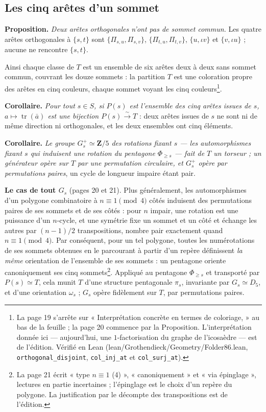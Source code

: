 \documentclass[11pt,a4paper]{article}
\begin{document}
\subsection*{Les cinq arêtes d'un sommet}

\textbf{Proposition.} \emph{Deux arêtes orthogonales n'ont pas de sommet
commun.} Les quatre arêtes orthogonales à $\{s, t\}$ sont $\{\Pi_{s,u},
\Pi_{s,v}\}$, $\{\Pi_{t,u}, \Pi_{t,v}\}$, $\{u, \iota v\}$ et $\{v, \iota u\}$ ;
aucune ne rencontre $\{s, t\}$.

Ainsi chaque classe de $T$ est un ensemble de six arêtes deux à deux sans
sommet commun, couvrant les douze sommets : la partition $T$ est une
coloration propre des arêtes en cinq couleurs, chaque sommet voyant les cinq
couleurs\footnote{La page 19 s'arrête sur « Interprétation concrète en termes
de coloriage, » au bas de la feuille ; la page 20 commence par la Proposition.
L'interprétation donnée ici --- aujourd'hui, une $1$-factorisation du graphe
de l'icosaèdre --- est de l'édition. Vérifié en Lean
(lean/Grothendieck/Geometry/Folder86.lean, \texttt{orthogonal\_disjoint},
\texttt{col\_inj\_at} et \texttt{col\_surj\_at}).}.

\textbf{Corollaire.} \emph{Pour tout $s \in S$, si $P(s)$ est l'ensemble des
cinq arêtes issues de $s$, $a \mapsto \operatorname{tr}(\bar a)$ est une
bijection $P(s) \xrightarrow{\sim} T$} : deux arêtes issues de $s$ ne sont ni
de même direction ni orthogonales, et les deux ensembles ont cinq éléments.

\textbf{Corollaire.} \emph{Le groupe $G_s^{+} \simeq \mathbf{Z}/5$ des
rotations fixant $s$ --- les automorphismes fixant $s$ qui induisent une
rotation du pentagone $\Phi_{\geq s}$ --- fait de $T$ un torseur ; un générateur
opère sur $T$ par une permutation circulaire, et $G_s^{+}$ opère par
permutations paires}, un cycle de longueur impaire étant pair.

\textbf{Le cas de tout $G_s$} (pages 20 et 21). Plus généralement, les
automorphismes d'un polygone combinatoire à $n \equiv 1 \pmod 4$ côtés
induisent des permutations paires de ses sommets et de ses côtés : pour $n$
impair, une rotation est une puissance d'un $n$-cycle, et une symétrie fixe un
sommet et un côté et échange les autres par $(n-1)/2$ transpositions, nombre
pair exactement quand $n \equiv 1 \pmod 4$. Par conséquent, pour un tel
polygone, toutes les numérotations de ses sommets obtenues en le parcourant à
partir d'un repère définissent \emph{la même} orientation de l'ensemble de ses
sommets : un pentagone oriente canoniquement ses cinq sommets\footnote{La page
21 écrit « type $n \equiv 1$ (4) », « canoniquement » et « via épinglage »,
lectures en partie incertaines ; l'épinglage est le choix d'un repère du
polygone. La justification par le décompte des transpositions est de
l'édition.}. Appliqué au pentagone $\Phi_{\geq s}$ et transporté par
$P(s) \simeq T$, cela munit $T$ d'une structure pentagonale $\pi_s$, invariante
par $G_s \simeq D_5$, et d'une orientation $\omega_s$ ; $G_s$ opère fidèlement
sur $T$, par permutations paires.
\end{document}
